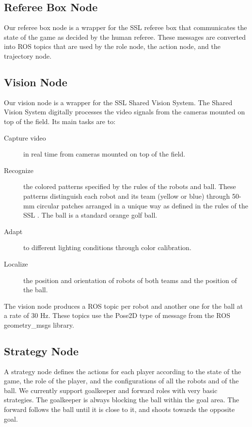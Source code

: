 \documentclass[]{llncs}
\begin{document}
\subsection{Referee Box Node}
Our referee box node is a wrapper for the SSL referee box that communicates the state of the game as decided by
the human referee. These messages are converted into ROS topics that are used by the role node, the action node, and the trajectory node.


\subsection{Vision Node}
Our vision node is a wrapper for the SSL Shared Vision System. The Shared Vision System \cite{zlbwv-sslvtsvsftrcssl-RoboCup-2009} digitally processes the video signals from the cameras mounted on top of the field. Its main tasks are to:
\begin{description}
	\item[Capture video] in real time from cameras mounted on top of the field.
	\item[Recognize] the colored patterns specified by the rules of the robots and ball. These patterns distinguish each robot and its team (yellow or blue) through 50-mm circular patches arranged in a unique way as defined in the rules of the SSL \cite{robocup-ssl-rules}. The ball is a standard orange golf ball.
	\item[Adapt] to different lighting conditions through color calibration.
	\item[Localize] the position and orientation of robots of both teams and the position of the ball.
\end{description}

The vision node produces a ROS topic per robot and another one for the ball at a rate of 30 Hz. These topics use the Pose2D type of message from the ROS geometry\_msgs library. 


\subsection{Strategy Node}
A strategy node defines the actions for each player according to the state of the game, the role of the player, and the configurations of all the robots and of the ball. We currently support goalkeeper and forward roles with very basic strategies. The goalkeeper is always blocking the ball within the goal area. The forward follows the ball until it is close to it, and shoots towards the opposite goal.
\end{document}

